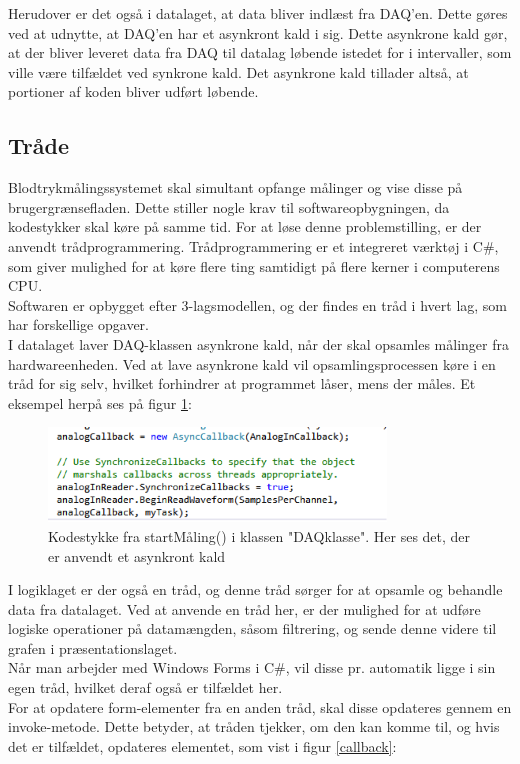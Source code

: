 Herudover er det også i datalaget, at data bliver indlæst fra DAQ'en. Dette gøres ved at udnytte, at DAQ'en har et asynkront kald i sig. Dette asynkrone kald gør, at der bliver leveret data fra DAQ til datalag løbende istedet for i intervaller, som ville være tilfældet ved synkrone kald. Det asynkrone kald tillader altså, at portioner af koden bliver udført løbende. 

\subsection{Tråde}
Blodtrykmålingssystemet skal simultant opfange målinger og vise disse på brugergrænsefladen. Dette stiller nogle krav til softwareopbygningen, da kodestykker skal køre på samme tid. For at løse denne problemstilling, er der anvendt trådprogrammering. Trådprogrammering er et integreret værktøj i C\#, som giver mulighed for at køre flere ting samtidigt på flere kerner i computerens CPU.\\
Softwaren er opbygget efter 3-lagsmodellen, og der findes en tråd i hvert lag, som har forskellige opgaver. \\
I datalaget laver DAQ-klassen asynkrone kald, når der skal opsamles målinger fra hardwareenheden. Ved at lave asynkrone kald vil opsamlingsprocessen køre i en tråd for sig selv, hvilket forhindrer at programmet låser, mens der måles. Et eksempel herpå ses på figur \ref{Traad}:

\begin{figure}[H]
	\centering
	\includegraphics[width=0.8\textwidth]{Figurer/SoftwareImplementering/Traad}
	\caption{Kodestykke fra startMåling() i klassen "DAQklasse". Her ses det, der er anvendt et asynkront kald}
	\label{Traad}
\end{figure}

I logiklaget er der også en tråd, og denne tråd sørger for at opsamle og behandle data fra datalaget. Ved at anvende en tråd her, er der mulighed for at udføre logiske operationer på datamængden, såsom filtrering, og sende denne videre til grafen i præsentationslaget.\\
Når man arbejder med Windows Forms i C\#, vil disse pr. automatik ligge i sin egen tråd, hvilket deraf også er tilfældet her.\\
For at opdatere form-elementer fra en anden tråd, skal disse opdateres gennem en invoke-metode. Dette betyder, at tråden tjekker, om den kan komme til, og hvis det er tilfældet, opdateres elementet, som vist i figur \ref{callback}:

